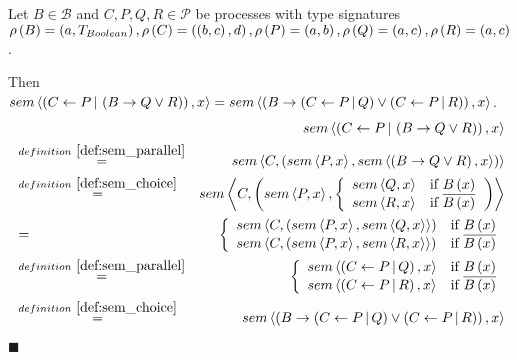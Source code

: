 \clearpage
\begin{myproof}
Let $B \in \mathcal{B}$ and $C, P, Q, R \in \mathcal{P}$ be processes with type signatures $\rho \left( B \right) = \left( a, T_{Boolean} \right), \rho \left( C \right) = \left( \left( b, c \right), d \right), \rho \left( P \right) = \left( a, b \right), \rho \left( Q \right) = \left( a, c \right), \rho \left( R \right) = \left( a, c \right)$.

Then $sem \left\langle \left( C \gets P \, | \, \left( B \to Q \vee R \right) \right), x \right\rangle = sem \left\langle \left( B \to \left( C \gets P \, | \, Q \right) \vee \left( C \gets P \, | \, R \right) \right), x \right\rangle$.
\begin{eqnarray*}
  &                                        & \sem{\parallel{C}{P}{\choice{B}{Q}{R}}}{x} \\
  & \overset{\defref{def:sem_parallel}}{=} & \sem{C}{\left( \sem{P}{x}, \sem{\choice{B}{Q}{R}}{x} \right)} \\
  & \overset{\defref{def:sem_choice}}{=}   & \sem{C}{\left( \sem{P}{x}, \left\{\begin{array}{ll}
                                                                                 \sem{Q}{x} & \text{if } B \left( x \right) \\
                                                                                 \sem{R}{x} & \text{if } \overline{B \left( x \right)}
                                                                               \end{array}
                                                                        \right.\right)} \\
  & =                                      & \left\{\begin{array}{ll}
                                                      \sem{C}{\left( \sem{P}{x}, \sem{Q}{x}} \right) & \text{if } B \left( x \right) \\
                                                      \sem{C}{\left( \sem{P}{x}, \sem{R}{x}} \right) & \text{if } \overline{B \left( x \right)}
                                                    \end{array}
                                             \right. \\
  & \overset{\defref{def:sem_parallel}}{=} & \left\{\begin{array}{ll}
                                                      \sem{\parallel{C}{P}{Q}}{x} & \text{if } B \left( x \right) \\
                                                      \sem{\parallel{C}{P}{R}}{x} & \text{if } \overline{B \left( x \right)}
                                                    \end{array}
                                             \right. \\
  & \overset{\defref{def:sem_choice}}{=}   & \sem{\choice{B}{\parallel{C}{P}{Q}}{\parallel{C}{P}{R}}}{x}
\end{eqnarray*}

\hfill$\blacksquare$
\end{myproof}

